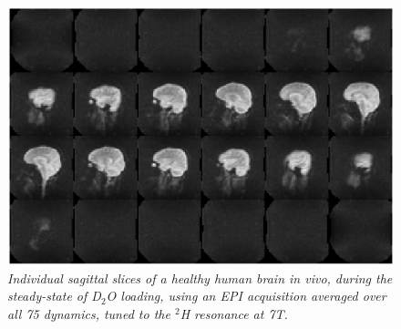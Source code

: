 \begin{figure}[H]
    \centering
    \includegraphics[width=1\textwidth]{Figures/D2O/EPI_avg.png}
    \caption{\textit{Individual sagittal slices of a healthy human brain in vivo, during the steady-state of D$_2$O loading, using an \ac{EPI} acquisition averaged over all 75 dynamics, tuned to the $^2$H resonance at 7T.}}
    \label{fig:D2O:EPI_avg}
\end{figure}